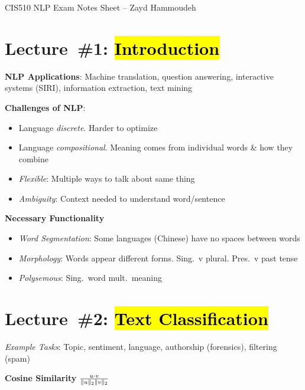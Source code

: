 \documentclass[9pt]{extarticle}
\renewcommand{\green}[1]{{\color{ForestGreen} #1}}
\newcommand{\greenbf}[1]{\textbf{\green{#1}}}
\begin{document}
\setlength{\abovedisplayskip}{0pt}
\setlength{\belowdisplayskip}{0pt}
\setlength{\abovedisplayshortskip}{0pt}
\setlength{\belowdisplayshortskip}{0pt}

\begin{center}
CIS510 NLP Exam Notes Sheet -- Zayd Hammoudeh
\end{center}
\begin{multicols}{3}
  \section*{Lecture~\#1: \hl{Introduction}}

  \textbf{NLP Applications}: Machine translation, question answering, interactive systems (SIRI), information extraction, text mining

  \textbf{Challenges of NLP}:
  \begin{itemize}
    \item Language \textit{discrete}. Harder to optimize
    \item Language \textit{compositional}. Meaning comes from individual words \& how they combine
    \item \textit{Flexible}: Multiple ways to talk about same thing
    \item \textit{Ambiguity}: Context needed to understand word/sentence
  \end{itemize}

  \textbf{Necessary Functionality}
  \begin{itemize}
    \item \textit{Word Segmentation}: Some languages (Chinese) have no spaces between words
    \item \textit{Morphology}: Words appear different forms. Sing.\ v plural. Pres.\ v past tense
    \item \textit{Polysemous}: Sing.\ word mult.\ meaning
  \end{itemize}

  \section*{Lecture~\#2: \hl{Text Classification}}
  \textit{Example Tasks}: Topic, sentiment, language, authorship (forensics), filtering (spam)

  \greenbf{Cosine Similarity} $\frac{u \cdot v}{\lVert u\rVert_{2} \lVert v\rVert_{2}}$

  \subsection*{}


\end{multicols}
\end{document}
